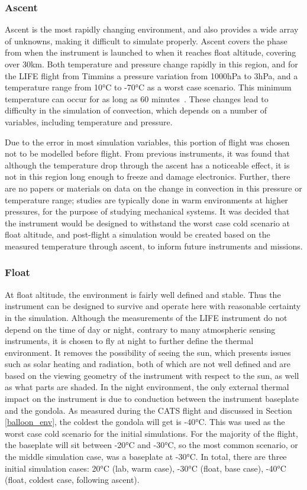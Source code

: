 \subsubsection{Ascent}
Ascent is the most rapidly changing environment, and also provides a wide array of unknowns, making it difficult to simulate properly. Ascent covers the phase from when the instrument is launched to when it reaches float altitude, covering over 30km. Both temperature and pressure change rapidly in this region, and for the LIFE flight from Timmins a pressure variation from 1000hPa to 3hPa, and a temperature range from 10°C to -70°C as a worst case scenario. This minimum temperature can occur for as long as 60 minutes~\citep{STRATOS_CARMENCITA_doc}. These changes lead to difficulty in the simulation of convection, which depends on a number of variables, including temperature and pressure.

Due to the error in most simulation variables, this portion of flight was chosen not to be modelled before flight. From previous instruments, it was found that although the temperature drop through the ascent has a noticeable effect, it is not in this region long enough to freeze and damage electronics. Further, there are no papers or materials on data on the change in convection in this pressure or temperature range; studies are typically done in warm environments at higher pressures, for the purpose of studying mechanical systems. It was decided that the instrument would be designed to withstand the worst case cold scenario at float altitude, and post-flight a simulation would be created based on the measured temperature through ascent, to inform future instruments and missions.

\subsubsection{Float}
At float altitude, the environment is fairly well defined and stable. Thus the instrument can be designed to survive and operate here with reasonable certainty in the simulation. Although the measurements of the LIFE instrument do not depend on the time of day or night, contrary to many atmospheric sensing instruments, it is chosen to fly at night to further define the thermal environment. It removes the possibility of seeing the sun, which presents issues such as solar heating and radiation, both of which are not well defined and are based on the viewing geometry of the instrument with respect to the sun, as well as what parts are shaded. In the night environment, the only external thermal impact on the instrument is due to conduction between the instrument baseplate and the gondola. As measured during the CATS flight and discussed in Section \ref{balloon_env}, the coldest the gondola will get is -40°C. This was used as the worst case cold scenario for the initial simulations. For the majority of the flight, the baseplate will sit between -20°C and -30°C, so the most common scenario, or the middle simulation case, was a baseplate at -30°C. In total, there are three initial simulation cases: 20°C (lab, warm case), -30°C (float, base case), -40°C (float, coldest case, following ascent). 

